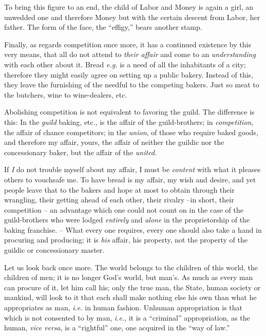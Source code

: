 To bring this figure to an end, the child of Labor and Money is again a girl, 
an unwedded one and therefore Money but with the certain descent from Labor, 
her father. The form of the face, the ``effigy,'' bears another stamp.

Finally, as regards competition once more, it has a continued existence by 
this very means, that all do not attend to \textit{their affair} and come to 
an \textit{understanding} with each other about it. Bread \textit{e.g.} is a 
need of all the inhabitants of a city; therefore they might easily agree on 
setting up a public bakery. Instead of this, they leave the furnishing of the 
needful to the competing bakers. Just so meat to the butchers, wine to 
wine-dealers, etc.

Abolishing competition is not equivalent to favoring the guild. The difference 
is this: In the \textit{guild} baking, etc., is the affair of the 
guild-brothers; in \textit{competition}, the affair of chance competitors; in 
the \textit{union}, of those who require baked goods, and therefore my affair, 
yours, the affair of neither the guildic nor the concessionary baker, but the 
affair of the \textit{united}.

If \textit{I} do not trouble myself about my affair, I must be 
\textit{content} with what it pleases others to vouchsafe me. To have bread is 
my affair, my wish and desire, and yet people leave that to the bakers and 
hope at most to obtain through their wrangling, their getting ahead of each 
other, their rivalry --in short, their competition -- an advantage which one 
could not count on in the case of the guild-brothers who were lodged 
\textit{entirely} and \textit{alone} in the proprietorship of the baking 
franchise. -- What every one requires, every one should also take a hand in 
procuring and producing; it is \textit{his} affair, his property, not the 
property of the guildic or concessionary master.

Let us look back once more. The world belongs to the children of this world, 
the children of men; it is no longer God's world, but man's. As much as every 
man can procure of it, let him call his; only the true man, the State, human 
society or mankind, will look to it that each shall make nothing else his own 
than what he appropriates as man, \textit{i.e.} in human fashion. Unhuman 
appropriation is that which is not consented to by man, \textit{i.e.}, it is a 
``criminal'' appropriation, as the human, \textit{vice versa}, is a 
``rightful'' one, one acquired in the ``way of law.''

